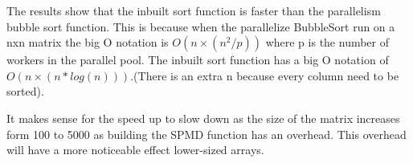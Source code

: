 The results show that the inbuilt sort function is faster than the parallelism bubble sort function.
This is because when the parallelize BubbleSort run on a nxn matrix the big O notation is $O(n×(n^2/p))$ where p is the number of workers in the parallel pool. 
The inbuilt sort function has a big O notation of $O(n×(n*log(n)))$.(There is an extra n because every column need to be sorted).

It makes sense for the speed up to slow down as the size of the matrix increases form 100 to 5000 as building the SPMD function has an overhead.
This overhead will have a more noticeable effect lower-sized arrays.
